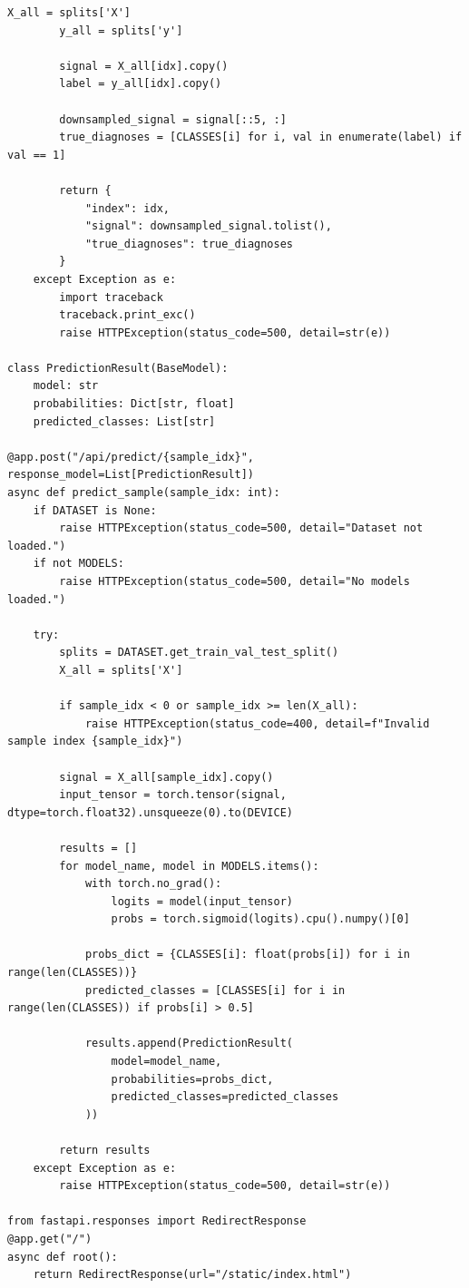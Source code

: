 \documentclass[12pt,a4paper]{report}
\begin{document}
\begin{lstlisting}[caption={Asynchronous FastAPI web service endpoint implementations (src/webapp/main.py)}]
        X_all = splits['X']
        y_all = splits['y']
        
        signal = X_all[idx].copy() 
        label = y_all[idx].copy() 
        
        downsampled_signal = signal[::5, :]
        true_diagnoses = [CLASSES[i] for i, val in enumerate(label) if val == 1]
        
        return {
            "index": idx,
            "signal": downsampled_signal.tolist(), 
            "true_diagnoses": true_diagnoses
        }
    except Exception as e:
        import traceback
        traceback.print_exc()
        raise HTTPException(status_code=500, detail=str(e))

class PredictionResult(BaseModel):
    model: str
    probabilities: Dict[str, float]
    predicted_classes: List[str]

@app.post("/api/predict/{sample_idx}", response_model=List[PredictionResult])
async def predict_sample(sample_idx: int):
    if DATASET is None:
        raise HTTPException(status_code=500, detail="Dataset not loaded.")
    if not MODELS:
        raise HTTPException(status_code=500, detail="No models loaded.")
    
    try:
        splits = DATASET.get_train_val_test_split()
        X_all = splits['X']
        
        if sample_idx < 0 or sample_idx >= len(X_all):
            raise HTTPException(status_code=400, detail=f"Invalid sample index {sample_idx}")
            
        signal = X_all[sample_idx].copy()
        input_tensor = torch.tensor(signal, dtype=torch.float32).unsqueeze(0).to(DEVICE)
        
        results = []
        for model_name, model in MODELS.items():
            with torch.no_grad():
                logits = model(input_tensor)
                probs = torch.sigmoid(logits).cpu().numpy()[0]
                
            probs_dict = {CLASSES[i]: float(probs[i]) for i in range(len(CLASSES))}
            predicted_classes = [CLASSES[i] for i in range(len(CLASSES)) if probs[i] > 0.5]
            
            results.append(PredictionResult(
                model=model_name,
                probabilities=probs_dict,
                predicted_classes=predicted_classes
            ))
            
        return results
    except Exception as e:
        raise HTTPException(status_code=500, detail=str(e))

from fastapi.responses import RedirectResponse
@app.get("/")
async def root():
    return RedirectResponse(url="/static/index.html")
\end{lstlisting}
\end{document}
